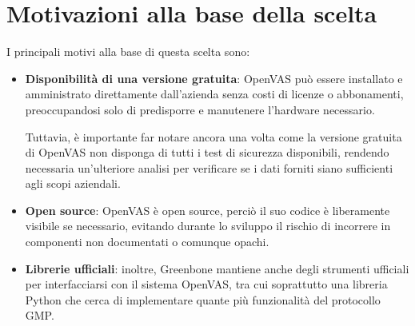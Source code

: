 \section{Motivazioni alla base della scelta}
I principali motivi alla base di questa scelta sono:
\begin{itemize}
    \item \textbf{Disponibilità di una versione gratuita}: OpenVAS può essere installato e amministrato direttamente dall'azienda senza costi di licenze o abbonamenti, preoccupandosi solo di predisporre e manutenere l'hardware necessario.
    
    Tuttavia, è importante far notare ancora una volta come la versione gratuita di OpenVAS non disponga di tutti i test di sicurezza disponibili, rendendo necessaria un'ulteriore analisi per verificare se i dati forniti siano sufficienti agli scopi aziendali.

    \item \textbf{Open source}: OpenVAS è open source, perciò il suo codice è liberamente visibile se necessario, evitando durante lo sviluppo il rischio di incorrere in componenti non documentati o comunque opachi.
    
    \item \textbf{Librerie ufficiali}: inoltre, Greenbone mantiene anche degli strumenti ufficiali per interfacciarsi con il sistema OpenVAS, tra cui soprattutto una libreria Python che cerca di implementare quante più funzionalità del protocollo GMP.
\end{itemize}